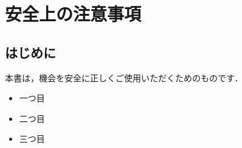 %
%

\section*{安全上の注意事項}

\subsection{はじめに}
本書は，機会を安全に正しくご使用いただくためのものです．
\vspace*{-1em}
\begin{itemize}
  \item 一つ目
  \item 二つ目
  \item 三つ目
\end{itemize}


